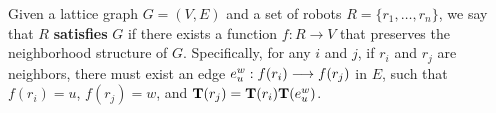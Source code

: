 \begin{figure}
  \centering
  
  \label{fig:edgetrans}
\end{figure}

\begin{defn}
  Given a lattice graph $G=(V, E)$ and a set of robots
    $R = \{ r_1, \ldots, r_n \}$,
  we say that $R$ \textbf{satisfies} $G$ if there exists a function
    $f: R \rightarrow V$
  that preserves the neighborhood structure of $G$.
  Specifically, for any $i$ and $j$, if $r_i$ and $r_j$ are neighbors, 
  there must exist an edge
  $e_u^w: {f(r_i)}\overset{}{\longrightarrow}{f(r_j)}$ in $E$, such that 
      $f(r_i) = u$,
      $f(r_j) = w$, and $\mathbf{T}(r_j) = \mathbf{T}(r_i) \mathbf{T}(e_{u}^w)$.
\end{defn}

